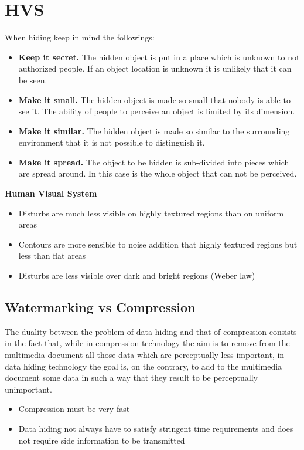 \documentclass[10pt,a4paper]{book}
\begin{document}
\newpage
\section{HVS}

When hiding keep in mind the followings:
\begin{itemize}
\item \textbf{Keep it secret.} The hidden object is put in a place which is
unknown to not authorized people. If an object location is
unknown it is unlikely that it can be seen.
\item  \textbf{Make it small.} The hidden object is made so small that nobody is
able to see it. The ability of people to perceive an object is
limited by its dimension.
\item \textbf{Make it similar.} The hidden object is made so similar to the
surrounding environment that it is not possible to distinguish it.
\item \textbf{Make it spread.} The object to be hidden is sub-divided into
pieces which are spread around. In this case is the whole object
that can not be perceived.
\end{itemize}

\textbf{Human Visual System}
\begin{itemize}
\item Disturbs are much less visible on highly textured regions than on
uniform areas
\item Contours are more sensible to noise addition that highly textured
regions but less than flat areas
\item  Disturbs are less visible over dark and bright regions (Weber law)
\end{itemize}

\subsection{Watermarking vs Compression}
The duality between the problem of data hiding and that of compression consists in the fact that, while in compression technology the aim is to remove from the multimedia document all those data which are perceptually less important, in data hiding technology the goal is, on the contrary, to add to the
multimedia document some data in such a way that they result to be perceptually unimportant.

\begin{itemize}
\item Compression must be very fast
\item  Data hiding not always have to satisfy stringent time requirements and does not require side information to be transmitted
\end{itemize}
\end{document}
